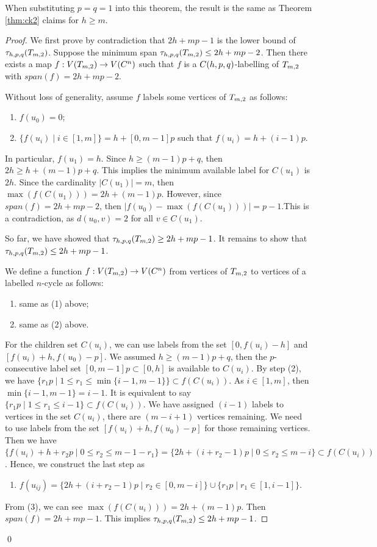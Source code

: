 When substituting $p=q=1$ into this theorem, the result is the same as Theorem \ref{thm:ck2} claims for $h \ge m$. 
\\
\begin{proof}
We first prove by contradiction that $2h+mp-1$ is the lower bound of $\thpq(\tm2)$. Suppose the minimum span $\thpq(\tm2) \le 2h+mp-2$. Then there exists a map $f:V(\tm2) \rightarrow V(C^n)$ such that $f$ is a $C(h,p,q)$-labelling of $\tm2$ with $span(f) = 2h+mp-2$. 

Without loss of generality, assume $f$ labels some vertices of $\tm2$ as follows: 

\begin{enumerate}[(1)]
\item $f(u_0) = 0$;
\item $\{f(u_i) \mid i \in [1,m]\} = h+[0,m-1]p$ such that $f(u_i) = h+(i-1)p$.
\end{enumerate}
In particular, $f(u_1) = h$. Since $h \ge (m-1)p+q$, then $2h \ge h+(m-1)p+q$. This implies the minimum available label for $C(u_1)$ is $2h$. Since the cardinality $|C(u_1)| = m$, then $\max(f(C(u_1))) = 2h+(m-1)p$. However, since $span(f) =2h+mp-2$, then $|f(u_0) - \max(f(C(u_1)))| = p-1$.This is a contradiction, as $d(u_0, v) = 2$ for all $v \in C(u_1)$. 

So far, we have showed that $\thpq(\tm2) \ge 2h+mp-1$. It remains to show that $\thpq(\tm2) \le 2h+mp-1$. 

We define a function $f: V(\tm2) \rightarrow V(C^n)$ from vertices of $\tm2$ to vertices of a labelled $n$-cycle as follows: 
\begin{enumerate}[(1)]
\item same as (1) above;
\item same as (2) above. 
\end{enumerate}
For the children set $C(u_i)$, we can use labels from the set $[0,f(u_i) - h]$ and $[f(u_i)+h, f(u_0) - p]$. We assumed $h \ge (m-1)p+q$, then the $p$-consecutive label set $[0,m-1]p \subset [0, h]$ is available to $C(u_i)$. By step (2), we  have $\{r_1p \mid 1 \le r_1 \le \min\{i-1, m-1\}\}\subset f(C(u_i))$. As $i \in [1,m]$, then $\min\{i-1,m-1\}=i-1$. It is equivalent to say $\{r_1p \mid 1 \le r_1 \le i-1\} \subset f(C(u_i))$. We have assigned $(i-1)$ labels to vertices in the set $C(u_i)$, there are $(m-i+1)$ vertices remaining. We need to use labels from the set $[f(u_i)+h, f(u_0) - p]$ for those remaining vertices. Then we have $\{f(u_i) + h + r_2p \mid 0 \le r_2 \le m-1-r_1\} = \{2h+(i+r_2-1)p \mid 0 \le r_2 \le m-i\} \subset f(C(u_i))$. Hence, we construct the last step as 
\begin{enumerate}[(3)]
\item $f(u_{ij}) = \{2h+(i+r_2-1)p \mid r_2 \in [0,m-i]\} \cup \{r_1p \mid r_1 \in [1,i-1]\}$. 
\end{enumerate}

From (3), we can see $\max(f(C(u_i))) = 2h+(m-1)p$. Then $span(f) = 2h+mp-1$. This implies $\thpq(\tm2) \le 2h+mp-1$. 
\end{proof}
\qed


